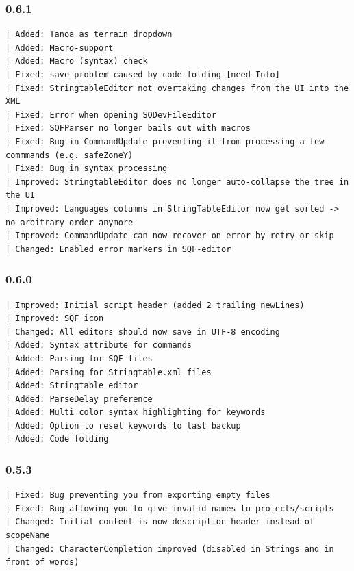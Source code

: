 \documentclass[twoside=false]{scrbook}
\begin{document}
	\subsubsection*{0.6.1}
	\begin{lstlisting}[breaklines=true]
| Added: Tanoa as terrain dropdown
| Added: Macro-support
| Added: Macro (syntax) check
| Fixed: save problem caused by code folding [need Info]
| Fixed: StringtableEditor not overtaking changes from the UI into the XML
| Fixed: Error when opening SQDevFileEditor
| Fixed: SQFParser no longer bails out with macros
| Fixed: Bug in CommandUpdate preventing it from processing a few commmands (e.g. safeZoneY)
| Fixed: Bug in syntax processing
| Improved: StringtableEditor does no longer auto-collapse the tree in the UI
| Improved: Languages columns in StringTableEditor now get sorted -> no arbitrary order anymore
| Improved: CommandUpdate can now recover on error by retry or skip
| Changed: Enabled error markers in SQF-editor
	\end{lstlisting}
	
	\subsubsection*{0.6.0}
	\begin{lstlisting}[breaklines=true]
| Improved: Initial script header (added 2 trailing newLines)
| Improved: SQF icon
| Changed: All editors should now save in UTF-8 encoding
| Added: Syntax attribute for commands
| Added: Parsing for SQF files
| Added: Parsing for Stringtable.xml files
| Added: Stringtable editor
| Added: ParseDelay preference
| Added: Multi color syntax highlighting for keywords
| Added: Option to reset keywords to last backup
| Added: Code folding
	\end{lstlisting}
	
	\subsubsection{0.5.3}
	\begin{lstlisting}[breaklines=true]
| Fixed: Bug preventing you from exporting empty files
| Fixed: Bug allowing you to give invalid names to projects/scripts
| Changed: Initial content is now description header instead of scopeName
| Changed: CharacterCompletion improved (disabled in Strings and in front of words)
	\end{lstlisting}
	
\end{document}
